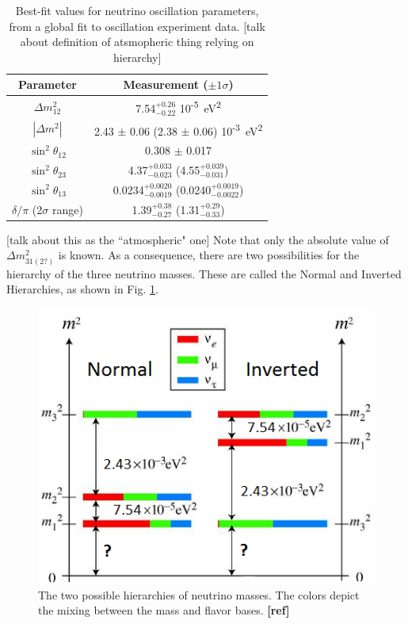 \begin{table}[!htbp]
\caption{Best-fit values for neutrino oscillation parameters, from a global fit to oscillation experiment data.   {\color{red}[talk about definition of atsmopheric thing relying on hierarchy]}\cite{ReviewNuMass}} %
\label{table:nu_osc_vals}
\begin{tabular}{c|c}
Parameter & Measurement ($\pm 1 \sigma$) \\
\hline
$\Delta m_{12}^{2}$ & 7.54$^{+0.26}_{-0.22}$ 10\textsuperscript{-5}~eV\textsuperscript{2}\\
$|\Delta m^{2}|$ & 2.43 $\pm$ 0.06 (2.38 $\pm$ 0.06) 10\textsuperscript{-3}~eV\textsuperscript{2}\\
$\sin^{2} \theta_{12}$ & 0.308 $\pm$ 0.017\\
$\sin^{2} \theta_{23}$ & 4.37$^{+0.033}_{-0.023}$ (4.55$^{+0.039}_{-0.031}$)\\
$\sin^{2} \theta_{13}$ & 0.0234$^{+0.0020}_{-0.0019}$ (0.0240$^{+0.0019}_{-0.0022}$)\\
$\delta / \pi$ (2$\sigma$ range)& 1.39$^{+0.38}_{-0.27}$ (1.31$^{+0.29}_{-0.33}$)\\
\end{tabular}
\end{table}

[talk about this as the ``atmospheric" one] Note that only the absolute value of $\Delta m_{31(2?)}^{2}$ is known.  As a consequence, there are two possibilities for the hierarchy of the three neutrino masses.  These are called the Normal and Inverted Hierarchies, as shown in Fig. \ref{fig:numasshier}.

\begin{figure}[H]
        \centering
                \includegraphics[width=.5\textwidth]{figures/hierarchy_alterred.png}
                \caption{The two possible hierarchies of neutrino masses.  The colors depict the mixing between the mass and flavor bases. {\color{red}\textbf{[ref]}}}
\label{fig:numasshier}
\end{figure}

